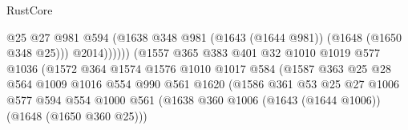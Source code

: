 \begin{lexlean}{RustCore}
\begin{coremodule}
                                                @25
                                                @27
                                                @981
                                                @594
                                                (@1638
                                                  @348
                                                  @981
                                                  (@1643 (@1644 @981))
                                                  (@1648 (@1650 @348 @25)))
                                                @2014))))))
                                    (@1557
                                      @365
                                      @383
                                      @401
                                      @32
                                      @1010
                                      @1019
                                      @577
                                      @1036
                                      (@1572
                                        @364
                                        @1574
                                        @1576
                                        @1010
                                        @1017
                                        @584
                                        (@1587
                                          @363
                                          @25
                                          @28
                                          @564
                                          @1009
                                          @1016
                                          @554
                                          @990
                                          @561
                                          @1620
                                          (@1586
                                            @361
                                            @53
                                            @25
                                            @27
                                            @1006
                                            @577
                                            @594
                                            @554
                                            @1000
                                            @561
                                            (@1638
                                              @360
                                              @1006
                                              (@1643 (@1644 @1006))
                                              (@1648 (@1650 @360 @25)))

\end{coremodule}
\end{lexlean}
